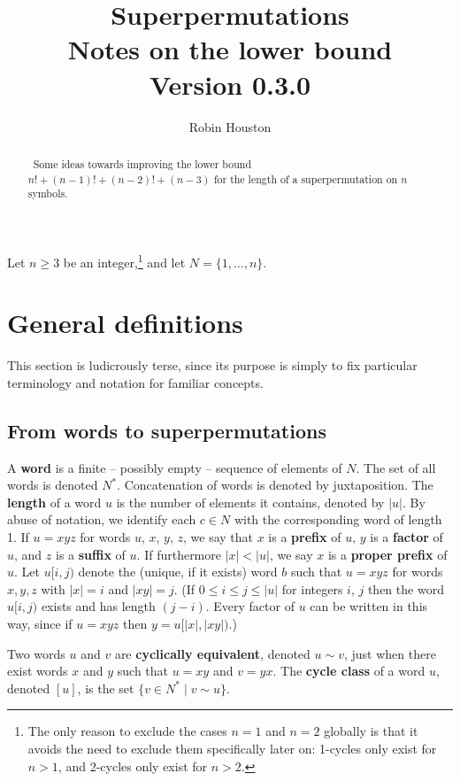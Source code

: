 \documentclass[a4paper]{article}
\author{Robin Houston}
\title{Superpermutations\\[0.4em]\large Notes on the lower bound\\[0.4em]\normalsize Version 0.3.0}
\theoremstyle{definition}
\theoremstyle{remark}
\let\definiendum\textbf
\begin{document}
\maketitle

\begin{abstract}\noindent\
    Some ideas towards improving the lower bound
    $
        n! + (n-1)! + (n-2)! + (n-3)
    $
    for the length of a superpermutation on $n$ symbols.
\end{abstract}

Let $n \ge 3$ be an integer,\footnote{
    The only reason to exclude the cases $n=1$ and $n=2$ globally is that it avoids the need to exclude them specifically later on: 1-cycles only exist for $n>1$, and 2-cycles only exist for $n>2$.
} and let $N = \{1, \dots, n\}$.

\section{General definitions}
%
This section is ludicrously terse, since its purpose is simply to fix particular terminology and notation for familiar concepts.

\subsection{From words to superpermutations}
A \definiendum{word} is a finite -- possibly empty -- sequence of elements of $N$. The set of all words is denoted $N^*$. Concatenation of words is denoted by juxtaposition. The \definiendum{length} of a word $u$ is the number of elements it contains, denoted by $|u|$. By abuse of notation, we identify each $c\in N$ with the corresponding word of length 1. If $u=xyz$ for words $u$, $x$, $y$, $z$, we say that $x$ is a \definiendum{prefix} of $u$, $y$ is a \definiendum{factor} of $u$, and $z$ is a \definiendum{suffix} of $u$. If furthermore $|x|<|u|$, we say $x$ is a \definiendum{proper prefix} of $u$. Let $u[i,j)$ denote the (unique, if it exists) word $b$ such that $u=xyz$ for words $x, y, z$ with $|x|=i$ and $|xy|=j$. (If $0\le i\le j\le|u|$ for integers $i$, $j$ then the word $u[i,j)$ exists and has length $(j-i)$. Every factor of $u$ can be written in this way, since if $u=xyz$ then $y=u[|x|, |xy|)$.)

Two words $u$ and $v$ are \definiendum{cyclically equivalent}, denoted $u\sim v$, just when there exist words $x$ and $y$ such that $u=xy$ and $v=yx$. The \definiendum{cycle class} of a word $u$, denoted $[u]$, is the set $\{v\in N^*\;|\;v\sim u\}$.
\end{document}
